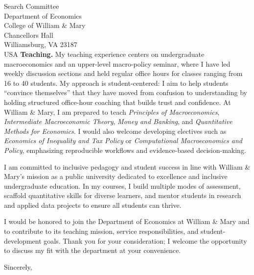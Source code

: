 \documentclass[11pt,letterpaper]{letter}
\begin{document}
\begin{letter}{Search Committee \\
Department of Economics \\
College of William \& Mary \\
Chancellors Hall \\
Williamsburg, VA 23187 \\ USA}
\textbf{Teaching.} My teaching experience centers on undergraduate macroeconomics and an upper-level macro-policy seminar, where I have led weekly discussion sections and held regular office hours for classes ranging from 16 to 40 students. My approach is student-centered: I aim to help students “convince themselves” that they have moved from confusion to understanding by holding structured office-hour coaching that builds trust and confidence. At William \& Mary, I am prepared to teach \textit{Principles of Macroeconomics}, \textit{Intermediate Macroeconomic Theory}, \textit{Money and Banking}, and \textit{Quantitative Methods for Economics}. I would also welcome developing electives such as \textit{Economics of Inequality and Tax Policy} or \textit{Computational Macroeconomics and Policy}, emphasizing reproducible workflows and evidence-based decision-making.

I am committed to inclusive pedagogy and student success in line with William \& Mary’s mission as a public university dedicated to excellence and inclusive undergraduate education. In my courses, I build multiple modes of assessment, scaffold quantitative skills for diverse learners, and mentor students in research and applied data projects to ensure all students can thrive.

I would be honored to join the Department of Economics at William \& Mary and to contribute to its teaching mission, service responsibilities, and student-development goals. Thank you for your consideration; I welcome the opportunity to discuss my fit with the department at your convenience.

\closing{Sincerely,}

\end{letter}
\end{document}

